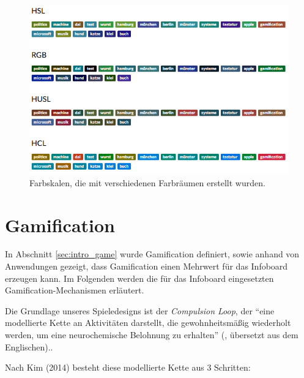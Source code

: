 \documentclass[12pt,twoside]{book}
\begin{document}
\begin{figure}[htbp]
    \centering
    \includegraphics[width=1.0\textwidth]{images/colors}
    \caption{Farbskalen, die mit verschiedenen Farbräumen erstellt wurden.}
    \label{fig:colors}
\end{figure}

\section{Gamification}\label{chap:game}


In Abschnitt \ref{sec:intro_game} wurde Gamification definiert, sowie anhand von Anwendungen gezeigt, dass Gamification einen Mehrwert für das Infoboard erzeugen kann. Im Folgenden werden die für das Infoboard eingesetzten Gamification-Mechanismen erläutert.

Die Grundlage unseres Spieledesigns ist der \textit{Compulsion Loop}, der ``eine modellierte Kette an Aktivitäten darstellt, die gewohnheitsmäßig wiederholt werden, um eine neurochemische Belohnung zu erhalten'' (\cite{gamasutra}, übersetzt aus dem Englischen)..

Nach Kim (2014) \citep{gamasutra} besteht diese modellierte Kette aus 3 Schritten:
\end{document}
